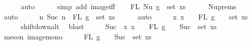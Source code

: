 \begin{isabellebody}
\ \ \ \ \isamarkupfalse%
\ auto\isanewline
\ \ \ \ \isamarkupfalse%
\ {\isacharparenleft}{\kern0pt}simp\ add{\isacharcolon}{\kern0pt}\ image{\isacharunderscore}{\kern0pt}iff{\isacharparenright}{\kern0pt}\isanewline
\isanewline
\ \ \isamarkupfalse%
\ {\isachardoublequoteopen}FL\ {\isacharparenleft}{\kern0pt}Nu\ g{\isacharparenright}{\kern0pt}\ {\isasymsubseteq}\ set\ xs{\isachardoublequoteclose}\isanewline
\ \ \ \ \isamarkupfalse%
\ Nu{\isachardot}{\kern0pt}prems{\isacharparenleft}{\kern0pt}{}{\isacharparenright}{\kern0pt}\ \isamarkupfalse%
\ auto\isanewline
\ \ \isamarkupfalse%
\ \isamarkupfalse%
\ {\isachardoublequoteopen}{\isacharbraceleft}{\kern0pt}n{\isachardot}{\kern0pt}\ Suc\ n\ {\isasymin}\ FL\ g{\isacharbraceright}{\kern0pt}\ {\isasymsubseteq}\ set\ xs{\isachardoublequoteclose}\isanewline
\ \ \ \ \isamarkupfalse%
\ auto\isanewline
\ \ \isamarkupfalse%
\ \isamarkupfalse%
\ {\isachardoublequoteopen}{\isacharparenleft}{\kern0pt}{\isasymlambda}x{\isachardot}{\kern0pt}\ x\ {\isacharminus}{\kern0pt}\ {}{\isacharparenright}{\kern0pt}\ {\isacharbackquote}{\kern0pt}\ {\isacharparenleft}{\kern0pt}FL\ g\ {\isacharminus}{\kern0pt}\ {\isacharbraceleft}{\kern0pt}{}{\isacharbraceright}{\kern0pt}{\isacharparenright}{\kern0pt}\ {\isasymsubseteq}\ set\ xs{\isachardoublequoteclose}\isanewline
\ \ \ \ \isamarkupfalse%
\ shift{\isacharunderscore}{\kern0pt}down{\isacharunderscore}{\kern0pt}alt\ \isamarkupfalse%
\ blast\isanewline
\ \ \isamarkupfalse%
\ \isamarkupfalse%
\ {\isachardoublequoteopen}Suc\ {\isacharbackquote}{\kern0pt}\ {\isacharparenleft}{\kern0pt}{\isasymlambda}x{\isachardot}{\kern0pt}\ x\ {\isacharminus}{\kern0pt}\ {}{\isacharparenright}{\kern0pt}\ {\isacharbackquote}{\kern0pt}\ {\isacharparenleft}{\kern0pt}FL\ g\ {\isacharminus}{\kern0pt}\ {\isacharbraceleft}{\kern0pt}{}{\isacharbraceright}{\kern0pt}{\isacharparenright}{\kern0pt}\ {\isasymsubseteq}\ Suc\ {\isacharbackquote}{\kern0pt}\ set\ xs{\isachardoublequoteclose}\isanewline
\ \ \ \ \isamarkupfalse%
\ {\isacharparenleft}{\kern0pt}meson\ image{\isacharunderscore}{\kern0pt}mono{\isacharparenright}{\kern0pt}\isanewline
\ \ \isamarkupfalse%
\ \isamarkupfalse%
\ {\isachardoublequoteopen}{\isacharparenleft}{\kern0pt}FL\ g\ {\isacharminus}{\kern0pt}\ {\isacharbraceleft}{\kern0pt}{}{\isacharbraceright}{\kern0pt}{\isacharparenright}{\kern0pt}\ {\isasymsubseteq}\ Suc\ {\isacharbackquote}{\kern0pt}\ set\ xs{\isachardoublequoteclose}\isanewline

\end{isabellebody}
